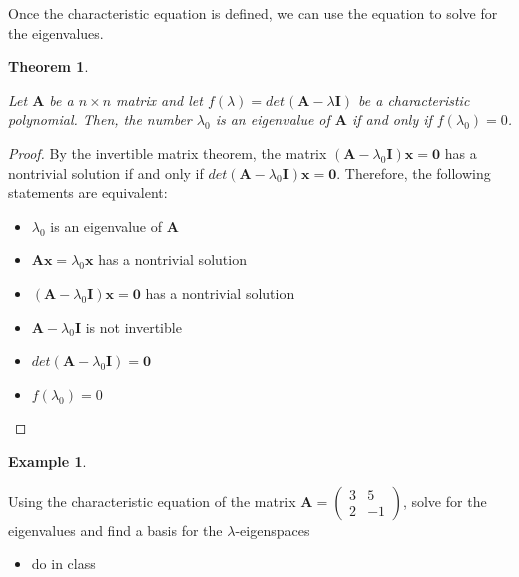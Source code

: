 \documentclass[
]{book}
\providecommand{\tightlist}{%
  \setlength{\itemsep}{0pt}\setlength{\parskip}{0pt}}
\newtheorem{theorem}{Theorem}[chapter]
\theoremstyle{definition}
\theoremstyle{definition}
\newtheorem{example}{Example}[chapter]
\theoremstyle{definition}
\theoremstyle{remark}
\begin{document}
Once the characteristic equation is defined, we can use the equation to solve for the eigenvalues.

\begin{theorem}
\protect\hypertarget{thm:unlabeled-div-170}{}\label{thm:unlabeled-div-170}

Let \(\mathbf{A}\) be a \(n \times n\) matrix and let \(f(\lambda) = det(\mathbf{A} - \lambda \mathbf{I})\) be a characteristic polynomial. Then, the number \(\lambda_0\) is an eigenvalue of \(\mathbf{A}\) if and only if \(f(\lambda_0) = 0\).

\end{theorem}

\begin{proof}

By the invertible matrix theorem, the matrix \((\mathbf{A} - \lambda_0 \mathbf{I}) \mathbf{x} = \mathbf{0}\) has a nontrivial solution if and only if \(det(\mathbf{A} - \lambda_0 \mathbf{I}) \mathbf{x} = \mathbf{0}\). Therefore, the following statements are equivalent:

\begin{itemize}
\item
  \(\lambda_0\) is an eigenvalue of \(\mathbf{A}\)
\item
  \(\mathbf{A} \mathbf{x} = \lambda_0 \mathbf{x}\) has a nontrivial solution
\item
  \((\mathbf{A} - \lambda_0 \mathbf{I}) \mathbf{x} = \mathbf{0}\) has a nontrivial solution
\item
  \(\mathbf{A} - \lambda_0 \mathbf{I}\) is not invertible
\item
  \(det(\mathbf{A} - \lambda_0 \mathbf{I}) = \mathbf{0}\)
\item
  \(f(\lambda_0) = 0\)
\end{itemize}

\end{proof}

\begin{example}
\protect\hypertarget{exm:unlabeled-div-172}{}\label{exm:unlabeled-div-172}

Using the characteristic equation of the matrix \(\mathbf{A} = \begin{pmatrix} 3 & 5 \\ 2 & -1 \end{pmatrix}\), solve for the eigenvalues and find a basis for the \(\lambda\)-eigenspaces

\begin{itemize}
\tightlist
\item
  do in class
\end{itemize}

\end{example}
\end{document}
